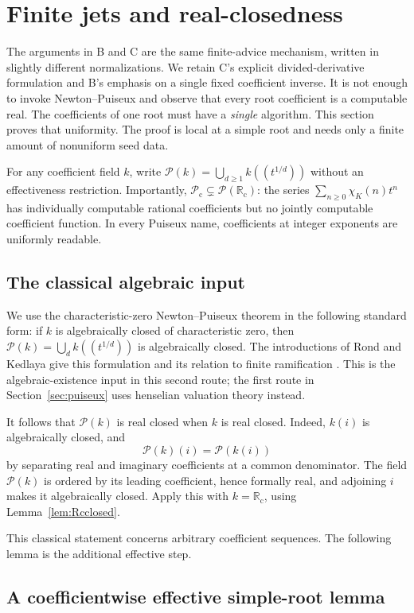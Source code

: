 \documentclass[11pt,letterpaper]{article}
\numberwithin{equation}{section}
\theoremstyle{definition}
\theoremstyle{remark}
\newcommand{\PP}{\mathcal P}
\newcommand{\Rc}{\mathbb R_{\mathrm c}}
\newcommand{\Pc}{\mathcal P_{\mathrm c}}
\begin{document}
\section{Finite jets and real-closedness}
\label{C-sec:realclosed}

The arguments in B and C are the same finite-advice mechanism, written in
slightly different normalizations. We retain C's explicit divided-derivative
formulation and B's emphasis on a single fixed coefficient inverse.
It is not enough to invoke Newton--Puiseux and observe that every root
coefficient is a computable real. The coefficients of one root must have a
\emph{single} algorithm. This section proves that uniformity. The proof is
local at a simple root and needs only a finite amount of nonuniform seed
data.

For any coefficient field $k$, write
$\PP(k)=\bigcup_{d\ge1}k((t^{1/d}))$ without an effectiveness restriction.
Importantly, $\Pc\subsetneq\PP(\Rc)$: the series
$\sum_{n\ge0}\chi_K(n)t^n$ has individually computable rational coefficients
but no jointly computable coefficient function. In every Puiseux name,
coefficients at integer exponents are uniformly readable.

\subsection{The classical algebraic input}

We use the characteristic-zero Newton--Puiseux theorem in the following
standard form: if $k$ is algebraically closed of characteristic zero, then
$\PP(k)=\bigcup_d k((t^{1/d}))$ is algebraically closed. The introductions of Rond and Kedlaya give this formulation and its relation
to finite ramification \cite{rond,kedlaya}. This is the algebraic-existence input in this second route; the first
route in Section~\ref{sec:puiseux} uses henselian valuation theory instead.

It follows that $\PP(k)$ is real closed when $k$ is real closed. Indeed,
$k(i)$ is algebraically closed, and
\[
 \PP(k)(i)=\PP(k(i))
\]
by separating real and imaginary coefficients at a common denominator.
The field $\PP(k)$ is ordered by its leading coefficient, hence formally
real, and adjoining $i$ makes it algebraically closed. Apply this with
$k=\Rc$, using Lemma~\ref{lem:Rcclosed}.

This classical statement concerns arbitrary coefficient sequences. The
following lemma is the additional effective step.

\subsection{A coefficientwise effective simple-root lemma}
\end{document}
